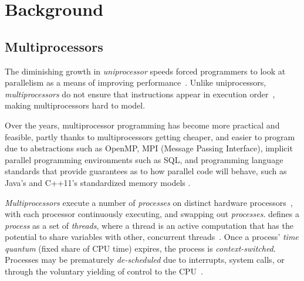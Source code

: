 \chapter{Background}


\section{Multiprocessors}
The diminishing growth in \emph{uniprocessor} speeds
forced programmers to look at parallelism as a means of improving
performance~\citep{cantrill2008real}. Unlike uniprocessors, \emph{multiprocessors} do
not ensure that instructions appear in execution order~\cite{scott2013shared},
making multiprocessors hard to model.


Over the years, multiprocessor programming has become more practical and
feasible, partly thanks to multiprocessors getting cheaper, and
easier to program due to abstractions such as OpenMP, MPI (Message Passing
Interface), implicit parallel programming environments such as SQL, and
programming language standards that provide guarantees as to how parallel code will
behave, such as Java's\citep{javamemorymodel2014} and C++11's
\citep{cppmemorymodel} standardized memory models
\citep[Chapter~2.2]{perfbook2021}.

\emph{Multiprocessors} execute a number of \emph{processes} on distinct
hardware processors~\citep[Appendix~B.2]{herlihy2020art}, with each processor
continuously executing, and swapping out \emph{processes}.
\citeauthor{scott2013shared} defines a \emph{process} as a set of
\emph{threads}, where a thread is an active computation that has the potential
to share variables with other, concurrent threads~\citep[p.6]{scott2013shared}.
Once a process' \emph{time quantum} (fixed share of CPU time) expires, the
process is \emph{context-switched}. Processes
may be prematurely \emph{de-scheduled} due to interrupts,
system calls, or through the voluntary yielding of control to the CPU~\citep[Section~3.2.3]{osconcepts2021}.

